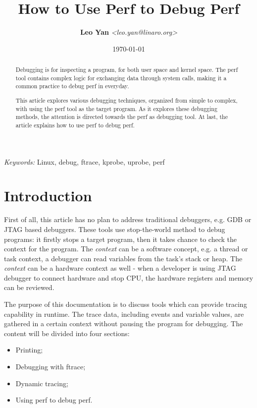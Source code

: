 \documentclass[11pt]{diazessay} %
\title{\textbf{How to Use Perf to Debug Perf}}
\author{\textbf{Leo Yan} \textit{<leo.yan@linaro.org>}} %
\date{\today} %
\begin{document}
\maketitle %


\begin{abstract}
Debugging is for inspecting a program, for both user space and kernel space.
The perf tool contains complex logic for exchanging data through system calls,
making it a common practice to debug perf in everyday.

This article explores various debugging techniques, organized from simple to
complex, with using the perf tool as the target program. As it explores these
debugging methods, the attention is directed towards the perf as debugging
tool. At last, the article explains how to use perf to debug perf.
\end{abstract}

\hspace*{3.6mm}\textit{Keywords: } Linux, debug, ftrace, kprobe, uprobe, perf
\vspace{30pt} %


\section*{Introduction}

First of all, this article has no plan to address traditional debuggers, e.g.
GDB or JTAG based debuggers. These tools use stop-the-world method to debug
programs: it firstly stops a target program, then it takes chance to check
the context for the program. The \textit{context} can be a software concept,
e.g. a thread or task context, a debugger can read variables from the task's
stack or heap. The \textit{context} can be a hardware context as well - when
a developer is using JTAG debugger to connect hardware and stop CPU, the
hardware registers and memory can be reviewed.

The purpose of this documentation is to discuss tools which can provide
tracing capability in runtime. The trace data, including events and variable
values, are gathered in a certain context without pausing the program for
debugging. The content will be divided into four sections:
\begin{itemize}
	\item Printing;
	\item Debugging with ftrace;
	\item Dynamic tracing;
	\item Using perf to debug perf.
\end{itemize}
\end{document}
